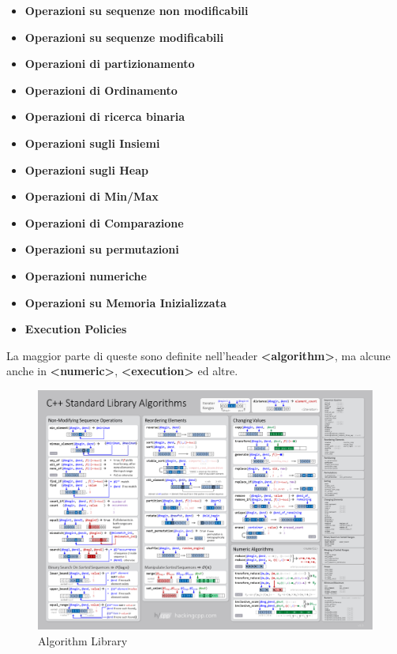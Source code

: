 \begin{itemize}
	\item \textsf{\small \textbf{Operazioni su sequenze non modificabili} }
	\item \textsf{\small \textbf{Operazioni su sequenze modificabili} }
	\item \textsf{\small \textbf{Operazioni di partizionamento} }
	\item \textsf{\small \textbf{Operazioni di Ordinamento} }
	\item \textsf{\small \textbf{Operazioni di ricerca binaria} }
	\item \textsf{\small \textbf{Operazioni sugli Insiemi} }
	\item \textsf{\small \textbf{Operazioni sugli Heap} }
	\item \textsf{\small \textbf{Operazioni di Min/Max} }
	\item \textsf{\small \textbf{Operazioni di Comparazione} }
	\item \textsf{\small \textbf{Operazioni su permutazioni} }
	\item \textsf{\small \textbf{Operazioni numeriche} }
	\item \textsf{\small \textbf{Operazioni su Memoria Inizializzata} }
	\item \textsf{\small \textbf{Execution Policies} }
\end{itemize}

\textsf{\small La maggior parte di queste sono definite nell'header \textbf{<algorithm>}, ma alcune anche in \textbf{<numeric>}, \textbf{<execution>} ed altre.} \\

\begin{figure}[H]
	\centering
	\includegraphics[width=1.2\textwidth, height=1.2\textheight, keepaspectratio]{./imgs/Algorithm_Library/algorithms.png}
	\caption{Algorithm Library}
	\label{fig:algorithms}
\end{figure}

